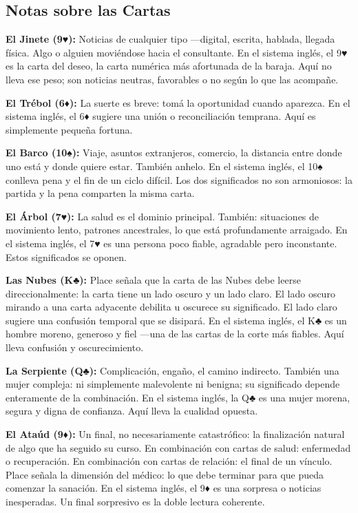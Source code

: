 \subsection{Notas sobre las Cartas}\label{card-notes}

\textbf{El Jinete (9♥):} Noticias de cualquier tipo ---digital, escrita, hablada, llegada física. Algo o alguien moviéndose hacia el consultante. En el sistema inglés, el 9♥ es la carta del deseo, la carta numérica más afortunada de la baraja. Aquí no lleva ese peso; son noticias neutras, favorables o no según lo que las acompañe.

\textbf{El Trébol (6♦):} La suerte es breve: tomá la oportunidad cuando aparezca. En el sistema inglés, el 6♦ sugiere una unión o reconciliación temprana. Aquí es simplemente pequeña fortuna.

\textbf{El Barco (10♠):} Viaje, asuntos extranjeros, comercio, la distancia entre donde uno está y donde quiere estar. También anhelo. En el sistema inglés, el 10♠ conlleva pena y el fin de un ciclo difícil. Los dos significados no son armoniosos: la partida y la pena comparten la misma carta.

\textbf{El Árbol (7♥):} La salud es el dominio principal. También: situaciones de movimiento lento, patrones ancestrales, lo que está profundamente arraigado. En el sistema inglés, el 7♥ es una persona poco fiable, agradable pero inconstante. Estos significados se oponen.

\textbf{Las Nubes (K♣):} Place señala que la carta de las Nubes debe leerse direccionalmente: la carta tiene un lado oscuro y un lado claro. El lado oscuro mirando a una carta adyacente debilita u oscurece su significado. El lado claro sugiere una confusión temporal que se disipará. En el sistema inglés, el K♣ es un hombre moreno, generoso y fiel ---una de las cartas de la corte más fiables. Aquí lleva confusión y oscurecimiento.

\textbf{La Serpiente (Q♣):} Complicación, engaño, el camino indirecto. También una mujer compleja: ni simplemente malevolente ni benigna; su significado depende enteramente de la combinación. En el sistema inglés, la Q♣ es una mujer morena, segura y digna de confianza. Aquí lleva la cualidad opuesta.

\textbf{El Ataúd (9♦):} Un final, no necesariamente catastrófico: la finalización natural de algo que ha seguido su curso. En combinación con cartas de salud: enfermedad o recuperación. En combinación con cartas de relación: el final de un vínculo. Place señala la dimensión del médico: lo que debe terminar para que pueda comenzar la sanación. En el sistema inglés, el 9♦ es una sorpresa o noticias inesperadas. Un final sorpresivo es la doble lectura coherente.

